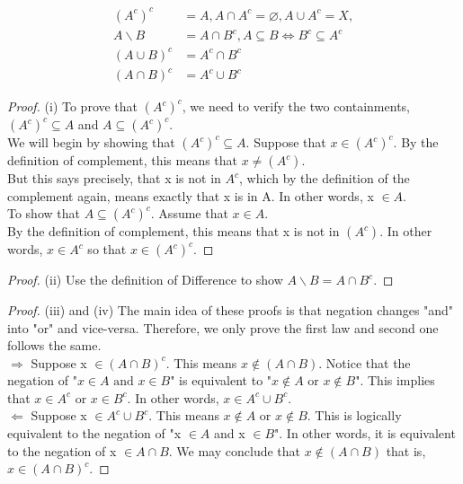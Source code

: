 \documentclass[letterpaper, 12pt]{article}
\newcommand{\1}{\mathds{1}}	%
\theoremstyle{definition}
\begin{document}
{
\begin{align*}
    (A^{c})^{c} &= A, A \cap A^c = \varnothing, A \cup A^c = X, \\
    A \backslash B &= A \cap B^c, A \subseteq B \Longleftrightarrow B^c \subseteq A^c \\
    (A \cup B)^c &= A^c \cap B^c \\
    (A \cap B)^c &= A^c \cup B^c
\end{align*}
\begin{proof}
    (i) To prove that $(A^c)^c$, we need to verify the two containments, $(A^c)^c \subseteq A$ and $A \subseteq (A^c)^c$.\\
    We will begin by showing that $(A^c)^{c} \subseteq A.$ Suppose that $x \in (A^c)^c.$ By the definition of complement, this means that $x \neq (A^c).$ \\
    But this says precisely, that x is not in $A^c$, which by the definition of the complement again, means exactly that x is in A. In other words, x $\in A.$ \\
    To show that $A \subseteq (A^c)^c$. Assume that $x \in A$. \\
    By the definition of complement, this means that x is not in $(A^c).$ In other words, $x \in A^c$ so that $x \in (A^c)^c$.
\end{proof}
\begin{proof}
    (ii) Use the definition of Difference to show $A \backslash B = A \cap B^c$.
\end{proof}
\begin{proof}
    (iii) and (iv) The main idea of these proofs is that negation changes "and" into "or" and vice-versa. Therefore, we only prove the first law and second one follows the same. \\
    $\Longrightarrow$ Suppose x $\in (A \cap B)^c$. This means $x \notin (A \cap B)$. Notice that the negation of "$x \in A \text{ and } x \in B$" is equivalent to "$x \notin A \text{ or } x \notin B$". This implies that $x \in A^c \text{ or } x \in B^c$. In other words, $x \in A^c \cup B^c$. \\
    $\Longleftarrow$ Suppose x $\in A^c \cup B^c$. This means $x \notin A$ or $x \notin B.$ This is logically equivalent to the negation of "x $\in A$ and x $\in B$". In other words, it is equivalent to the negation of x $\in A \cap B$. We may conclude that $x \notin (A \cap B)$ that is, $x \in (A \cap B)^c.$ 
\end{proof}

}
\end{document}
